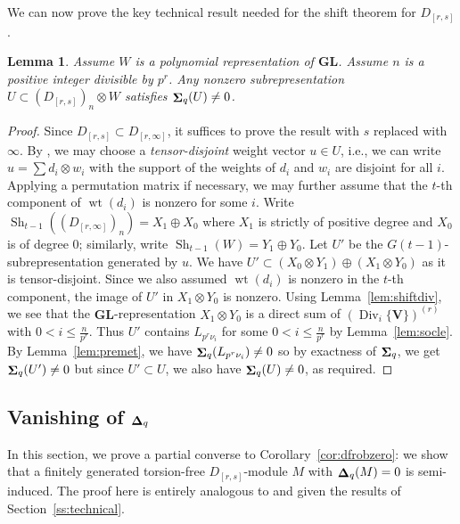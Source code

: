 \documentclass[12pt]{amsart}
\newcommand{\bV}{\mathbf{V}}
\DeclareMathOperator{\wgt}{wt}
\DeclareMathOperator{\Div}{Div}
\DeclareMathOperator{\Sh}{\bf{\Sigma}}
\DeclareMathOperator{\nSh}{Sh}
\DeclareMathOperator{\De}{\bf{\Delta}}
\newcommand{\Drs}{D_{[r,s]}}
\newcommand{\Drinfty}{D_{[r,\infty]}}
\newcommand{\mShq}{\Sh_{q}}
\newcommand{\mDeq}{\De_{q}}
\newcommand{\GL}{\mathbf{GL}}
\numberwithin{equation}{section}
\newtheorem{lemma}[equation]{Lemma}
\theoremstyle{definition}
\theoremstyle{plain}
\begin{document}
We can now prove the key technical result needed for the shift theorem for $\Drs$.
\begin{lemma}\label{lem:newlemma}
    Assume $W$ is a polynomial representation of $\GL$. Assume $n$ is a positive integer divisible by $p^r$. Any nonzero subrepresentation $U \subset (\Drs)_n \otimes W$ satisfies $\mShq(U) \ne 0$.
\end{lemma}
\begin{proof}
Since $\Drs \subset \Drinfty$, it suffices to prove the result with $s$ replaced with $\infty$. By \cite[Proposition~4.8]{gan25pol}, we may choose a \textit{tensor-disjoint} weight vector $u \in U$, i.e., we can write $u = \sum d_i \otimes w_i$ with the support of the weights of $d_i$ and $w_i$ are disjoint for all $i$.
Applying a permutation matrix if necessary, we may further assume that the $t$-th component of $\wgt(d_i)$ is nonzero for some $i$. Write $\nSh_{t-1}((\Drinfty)_n) =  X_1 \oplus X_0$ where $X_1$ is strictly of positive degree and $X_0$ is of degree $0$; similarly, write $\nSh_{t-1}(W) = Y_1 \oplus Y_0$. 
Let $U'$ be the $G(t-1)$-subrepresentation generated by $u$. 
We have $U' \subset (X_0 \otimes Y_1) \oplus (X_1 \otimes Y_0)$ as it is tensor-disjoint. Since we also assumed $\wgt(d_i)$ is nonzero in the $t$-th component, the image of $U'$ in $X_1 \otimes Y_0$ is nonzero. Using Lemma~\ref{lem:shiftdiv}, we see that the $\GL$-representation $X_1 \otimes Y_0$ is a direct sum of $(\Div_i\{\bV\})^{(r)}$ with $0 < i \leq \frac{n}{p^r} $. Thus $U'$ contains $L_{p^r \nu_i}$ for some $0 < i \leq \frac{n}{p^r}$ by Lemma~\ref{lem:socle}. By Lemma~\ref{lem:premet}, we have $\mShq(L_{p^r \nu_i}) \ne 0$ so by exactness of $\mShq$, we get $\mShq(U') \ne 0$ but since $U' \subset U$, we also have $\mShq(U) \ne 0$, as required.
\end{proof}

\subsection{Vanishing of \texorpdfstring{$\mDeq$}{Delta}} \label{ss:deltavanishing}
 In this section, we prove a partial converse to Corollary~\ref{cor:dfrobzero}: we show that a finitely generated torsion-free $\Drs$-module $M$ with $\mDeq(M) = 0$ is semi-induced.  The  proof here is entirely analogous to \cite[Section~4.3]{gan22ext} and \cite[Section~5.3]{gan25pol} given the results of Section~\ref{ss:technical}.
\end{document}
